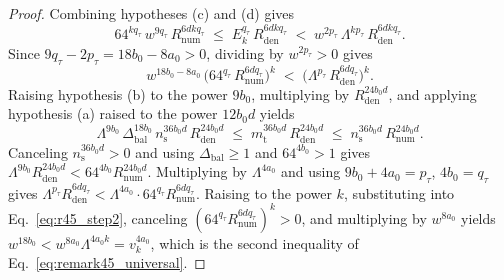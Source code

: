 \documentclass[11pt,a4paper]{article}
\theoremstyle{plain}
\theoremstyle{definition}
\theoremstyle{remark}
\begin{document}
\begin{proof}
Combining hypotheses (c) and (d) gives
\begin{equation}
    64^{k q_\tau}\,w^{9 q_\tau}\,R_{\mathrm{num}}^{6 d k q_\tau} \;\le\; E_k^{q_\tau}\,R_{\mathrm{den}}^{6 d k q_\tau} \;<\; w^{2 p_\tau}\,\Lambda^{k p_\tau}\,R_{\mathrm{den}}^{6 d k q_\tau} .
    \label{eq:r45_step1}
\end{equation}
Since $9 q_\tau - 2 p_\tau = 18 b_0 - 8 a_0 > 0$, dividing by $w^{2 p_\tau} > 0$ gives
\begin{equation}
    w^{18 b_0 - 8 a_0}\,\bigl(64^{q_\tau}\,R_{\mathrm{num}}^{6 d q_\tau}\bigr)^k \;<\; \bigl(\Lambda^{p_\tau}\,R_{\mathrm{den}}^{6 d q_\tau}\bigr)^k .
    \label{eq:r45_step2}
\end{equation}
Raising hypothesis (b) to the power $9 b_0$, multiplying by $R_{\mathrm{den}}^{24 b_0 d}$, and applying hypothesis (a) raised to the power $12 b_0 d$ yields
\begin{equation}
    \Lambda^{9 b_0}\,\Delta_{\mathrm{bal}}^{18 b_0}\,n_{\mathrm{s}}^{36 b_0 d}\,R_{\mathrm{den}}^{24 b_0 d} \;\le\; m_{\mathrm{t}}^{36 b_0 d}\,R_{\mathrm{den}}^{24 b_0 d} \;\le\; n_{\mathrm{s}}^{36 b_0 d}\,R_{\mathrm{num}}^{24 b_0 d} .
    \label{eq:r45_cancel}
\end{equation}
Canceling $n_{\mathrm{s}}^{36 b_0 d} > 0$ and using $\Delta_{\mathrm{bal}} \ge 1$ and $64^{4 b_0} > 1$ gives $\Lambda^{9 b_0} R_{\mathrm{den}}^{24 b_0 d} < 64^{4 b_0} R_{\mathrm{num}}^{24 b_0 d}$. Multiplying by $\Lambda^{4 a_0}$ and using $9 b_0 + 4 a_0 = p_\tau$, $4 b_0 = q_\tau$ gives $\Lambda^{p_\tau} R_{\mathrm{den}}^{6 d q_\tau} < \Lambda^{4 a_0} \cdot 64^{q_\tau} R_{\mathrm{num}}^{6 d q_\tau}$. Raising to the power $k$, substituting into Eq.~\eqref{eq:r45_step2}, canceling $(64^{q_\tau} R_{\mathrm{num}}^{6 d q_\tau})^k > 0$, and multiplying by $w^{8 a_0}$ yields $w^{18 b_0} < w^{8 a_0}\Lambda^{4 a_0 k} = v_k^{4 a_0}$, which is the second inequality of Eq.~\eqref{eq:remark45_universal}.


\end{proof}
\end{document}
